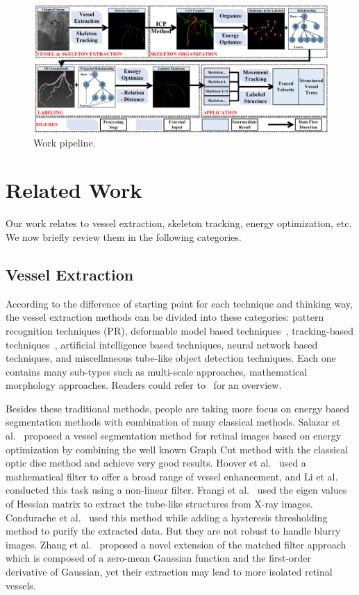 \documentclass[journal]{IEEEtran}
\begin{document}
\begin{figure}[!t]
\centering
\includegraphics[width=1.0\linewidth]{./images/pipeline.png}
\caption{Work pipeline.}
\label{fig:pipeline}
\end{figure}

\section{Related Work}
\label{sec:related-work}
Our work relates to vessel extraction, skeleton tracking, energy optimization, etc. We now briefly review them in the following categories.

\subsection{Vessel Extraction}
According to the difference of starting point for each technique and thinking way, the vessel extraction methods can be divided into these categories: pattern recognition techniques (PR), deformable model based techniques~\cite{Deformable2}\cite{Deformable3}, tracking-based techniques~\cite{Tracking2}\cite{Tracking3}\cite{Tracking5}, artificial intelligence based techniques, neural network based techniques, and miscellaneous tube-like object detection techniques. Each one contains many sub-types such as multi-scale approaches, mathematical morphology approaches. Readers could refer to~\cite{Kirbas} for an overview. 

Besides these traditional methods, people are taking more focus on energy based segmentation methods with combination of many classical methods. Salazar et al.~\cite{6725621} proposed a vessel segmentation method for retinal images based on energy optimization by combining the well known Graph Cut method with the classical optic disc method and achieve very good results. Hoover et al.~\cite{Hoover} used a mathematical filter to offer a broad range of vessel enhancement, and Li et al.~\cite{Li} conducted this task using a non-linear filter. Frangi et al.~\cite{Frangi} used the eigen values of Hessian matrix to extract the tube-like structures from X-ray images. Condurache et al.~\cite{Condurache} used this method while adding a hysteresis thresholding method to purify the extracted data. But they are not robust to handle blurry images. Zhang et al.~\cite{Zhang2010438} proposed a novel extension of the matched filter approach which is composed of a zero-mean Gaussian function and the first-order derivative of Gaussian, yet their extraction may lead to more isolated retinal vessels.
\end{document}
